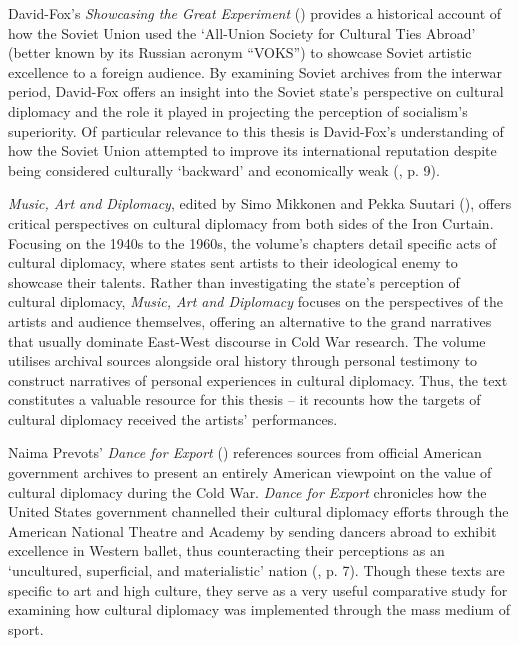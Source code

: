 David-Fox’s \textit{Showcasing the Great Experiment} (\citeyear{david-fox2011}) provides a historical account of how the Soviet Union used the ‘All-Union Society for Cultural Ties Abroad’ (better known by its Russian acronym “VOKS”) to showcase Soviet artistic excellence to a foreign audience. By examining Soviet archives from the interwar period, David-Fox offers an insight into the Soviet state’s perspective on cultural diplomacy and the role it played in projecting the perception of socialism’s superiority. Of particular relevance to this thesis is David-Fox’s understanding of how the Soviet Union attempted to improve its international reputation despite being considered culturally ‘backward’ and economically weak (\citeyear{david-fox2011}, p. 9).

\textit{Music, Art and Diplomacy}, edited by Simo Mikkonen and Pekka Suutari (\citeyear{mikkonensuutari2016}), offers critical perspectives on cultural diplomacy from both sides of the Iron Curtain. Focusing on the 1940s to the 1960s, the volume’s chapters detail specific acts of cultural diplomacy, where states sent artists to their ideological enemy to showcase their talents. Rather than investigating the state’s perception of cultural diplomacy, \textit{Music, Art and Diplomacy} focuses on the perspectives of the artists and audience themselves, offering an alternative to the grand narratives that usually dominate East-West discourse in Cold War research. The volume utilises archival sources alongside oral history through personal testimony to construct narratives of personal experiences in cultural diplomacy. Thus, the text constitutes a valuable resource for this thesis – it recounts how the targets of cultural diplomacy received the artists’ performances.

Naima Prevots’ \textit{Dance for Export} (\citeyear{prevots1998}) references sources from official American government archives to present an entirely American viewpoint on the value of cultural diplomacy during the Cold War. \textit{Dance for Export} chronicles how the United States government channelled their cultural diplomacy efforts through the American National Theatre and Academy by sending dancers abroad to exhibit excellence in Western ballet, thus counteracting their perceptions as an ‘uncultured, superficial, and materialistic’ nation (\cite{prevots1998}, p. 7). Though these texts are specific to art and high culture, they serve as a very useful comparative study for examining how cultural diplomacy was implemented through the mass medium of sport.

